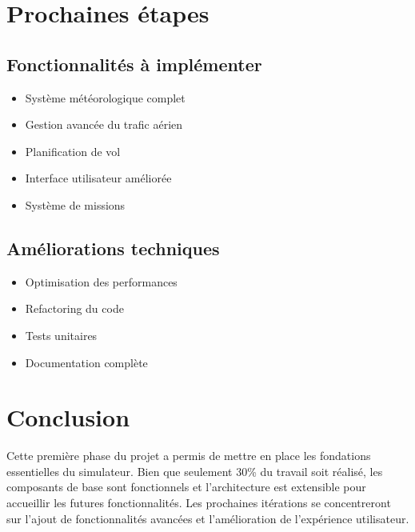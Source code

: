 \documentclass[12pt,a4paper]{article}
\begin{document}
%

\section{Prochaines étapes}

\subsection{Fonctionnalités à implémenter}
\begin{itemize}
    \item Système météorologique complet
    \item Gestion avancée du trafic aérien
    \item Planification de vol
    \item Interface utilisateur améliorée
    \item Système de missions
\end{itemize}

\subsection{Améliorations techniques}
\begin{itemize}
    \item Optimisation des performances
    \item Refactoring du code
    \item Tests unitaires
    \item Documentation complète
\end{itemize}

\section{Conclusion}
Cette première phase du projet a permis de mettre en place les fondations essentielles du simulateur. Bien que seulement 30\% du travail soit réalisé, les composants de base sont fonctionnels et l'architecture est extensible pour accueillir les futures fonctionnalités. Les prochaines itérations se concentreront sur l'ajout de fonctionnalités avancées et l'amélioration de l'expérience utilisateur.
\end{document}
